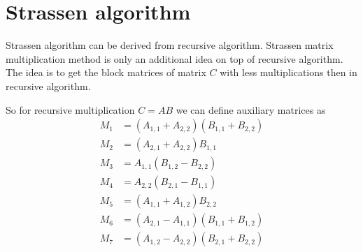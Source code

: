 \documentclass[a4paper,11pt]{article}
\begin{document}
\section{Strassen algorithm}

Strassen algorithm can be derived from recursive algorithm. 
Strassen matrix multiplication method is only an additional idea on top of recursive algorithm.
The idea is to get the block matrices of matrix $C$ with less multiplications then in recursive algorithm. 

So for recursive multiplication $C=AB$ we can define auxiliary matrices as 
\begin{align*}
M_{1} &= (A_{1,1} + A_{2,2})(B_{1,1} + B_{2,2}) \\
M_{2} &= (A_{2,1} + A_{2,2})B_{1,1} \\
M_{3} &= A_{1,1}(B_{1,2} - B_{2,2}) \\
M_{4} &= A_{2,2}(B_{2,1} - B_{1,1}) \\
M_{5} &= (A_{1,1} + A_{1,2})B_{2,2} \\
M_{6} &= (A_{2,1} - A_{1,1})(B_{1,1} + B_{1,2}) \\
M_{7} &= (A_{1,2} - A_{2,2})(B_{2,1} + B_{2,2})
\end{align*}
\end{document}
